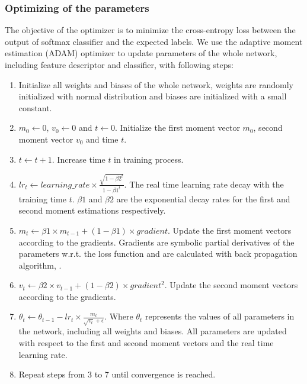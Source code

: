 \subsubsection*{Optimizing of the parameters}
\label{optimizer}
The objective of the optimizer is to minimize the cross-entropy loss between the output of softmax classifier and the expected labels. We use the adaptive moment estimation (ADAM) optimizer to update parameters of the whole network, including feature descriptor and classifier, with following steps: 
\begin{enumerate}
	\item Initialize all weights and biases of the whole network, weights are randomly initialized with normal distribution and biases are initialized with a small constant.
	
	\item \(m_0 \leftarrow 0\), \(v_0 \leftarrow 0\) and \(t \leftarrow 0\). Initialize the first moment vector \(m_0\), second moment vector \(v_0\) and time \(t\).
	
	\item \(t \leftarrow t + 1 \). Increase time \(t\) in training process.
	\item \(lr_t \leftarrow learning\_rate \times \frac{\sqrt{1 - \beta2^t}}{1 - \beta1^t}\). The real time learning rate decay with the training time \(t\). \(\beta1\) and \(\beta2\) are the exponential decay rates for the first and second moment estimations respectively.
	
	\item \(m_t \leftarrow \beta1 \times m_{t-1} + (1-\beta1) \times gradient \). Update the first moment vectors according to the gradients. Gradients are symbolic partial derivatives of the parameters w.r.t. the loss function and are calculated with back propagation algorithm, \cite{bpa}. 
	
	\item \(v_t \leftarrow \beta2 \times v_{t-1} + (1-\beta2) \times gradient^2 \). Update the second moment vectors according to the gradients.
	
	\item \(\theta_t \leftarrow \theta_{t-1} - lr_t \times \frac{m_t}{\sqrt{v_t} + \epsilon}\). Where \(\theta_t\) represents the values of all parameters in the network, including all weights and biases. All parameters are updated with respect to the first and second moment vectors and the real time learning rate.
	 
	\item Repeat steps from 3 to 7 until convergence is reached.  
\end{enumerate}


